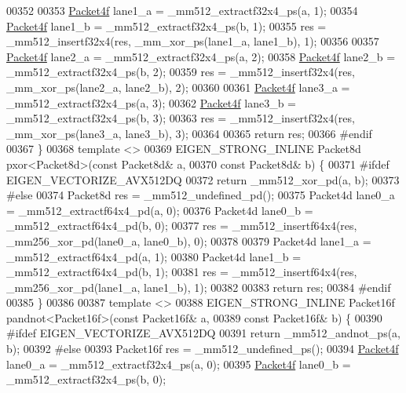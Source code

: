 \begin{DoxyCode}
00352 
00353   \hyperlink{struct_eigen_1_1internal_1_1_packet4f}{Packet4f} lane1\_a = \_mm512\_extractf32x4\_ps(a, 1);
00354   \hyperlink{struct_eigen_1_1internal_1_1_packet4f}{Packet4f} lane1\_b = \_mm512\_extractf32x4\_ps(b, 1);
00355   res = \_mm512\_insertf32x4(res, \_mm\_xor\_ps(lane1\_a, lane1\_b), 1);
00356 
00357   \hyperlink{struct_eigen_1_1internal_1_1_packet4f}{Packet4f} lane2\_a = \_mm512\_extractf32x4\_ps(a, 2);
00358   \hyperlink{struct_eigen_1_1internal_1_1_packet4f}{Packet4f} lane2\_b = \_mm512\_extractf32x4\_ps(b, 2);
00359   res = \_mm512\_insertf32x4(res, \_mm\_xor\_ps(lane2\_a, lane2\_b), 2);
00360 
00361   \hyperlink{struct_eigen_1_1internal_1_1_packet4f}{Packet4f} lane3\_a = \_mm512\_extractf32x4\_ps(a, 3);
00362   \hyperlink{struct_eigen_1_1internal_1_1_packet4f}{Packet4f} lane3\_b = \_mm512\_extractf32x4\_ps(b, 3);
00363   res = \_mm512\_insertf32x4(res, \_mm\_xor\_ps(lane3\_a, lane3\_b), 3);
00364 
00365   \textcolor{keywordflow}{return} res;
00366 \textcolor{preprocessor}{#endif}
00367 \}
00368 \textcolor{keyword}{template} <>
00369 EIGEN\_STRONG\_INLINE Packet8d pxor<Packet8d>(\textcolor{keyword}{const} Packet8d& a,
00370                                             \textcolor{keyword}{const} Packet8d& b) \{
00371 \textcolor{preprocessor}{#ifdef EIGEN\_VECTORIZE\_AVX512DQ}
00372   \textcolor{keywordflow}{return} \_mm512\_xor\_pd(a, b);
00373 \textcolor{preprocessor}{#else}
00374   Packet8d res = \_mm512\_undefined\_pd();
00375   Packet4d lane0\_a = \_mm512\_extractf64x4\_pd(a, 0);
00376   Packet4d lane0\_b = \_mm512\_extractf64x4\_pd(b, 0);
00377   res = \_mm512\_insertf64x4(res, \_mm256\_xor\_pd(lane0\_a, lane0\_b), 0);
00378 
00379   Packet4d lane1\_a = \_mm512\_extractf64x4\_pd(a, 1);
00380   Packet4d lane1\_b = \_mm512\_extractf64x4\_pd(b, 1);
00381   res = \_mm512\_insertf64x4(res, \_mm256\_xor\_pd(lane1\_a, lane1\_b), 1);
00382 
00383   \textcolor{keywordflow}{return} res;
00384 \textcolor{preprocessor}{#endif}
00385 \}
00386 
00387 \textcolor{keyword}{template} <>
00388 EIGEN\_STRONG\_INLINE Packet16f pandnot<Packet16f>(\textcolor{keyword}{const} Packet16f& a,
00389                                                  \textcolor{keyword}{const} Packet16f& b) \{
00390 \textcolor{preprocessor}{#ifdef EIGEN\_VECTORIZE\_AVX512DQ}
00391   \textcolor{keywordflow}{return} \_mm512\_andnot\_ps(a, b);
00392 \textcolor{preprocessor}{#else}
00393   Packet16f res = \_mm512\_undefined\_ps();
00394   \hyperlink{struct_eigen_1_1internal_1_1_packet4f}{Packet4f} lane0\_a = \_mm512\_extractf32x4\_ps(a, 0);
00395   \hyperlink{struct_eigen_1_1internal_1_1_packet4f}{Packet4f} lane0\_b = \_mm512\_extractf32x4\_ps(b, 0);

\end{DoxyCode}
